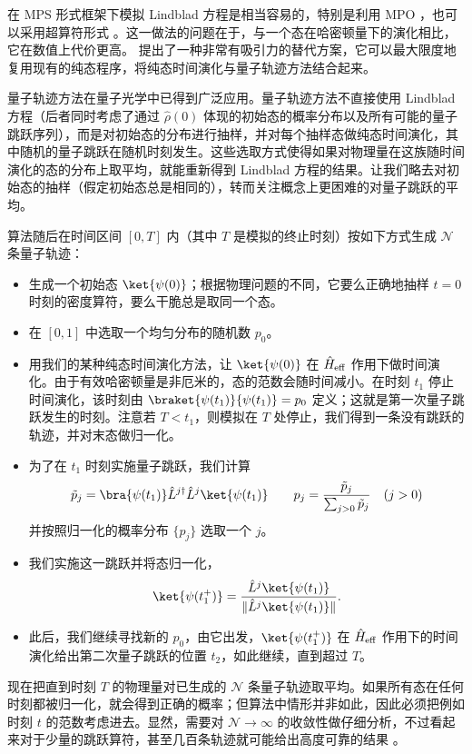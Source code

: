在 MPS 形式框架下模拟 Lindblad 方程是相当容易的，特别是利用 MPO \cite{VerstraeteRipoll04}，也可以采用超算符形式 \cite{VidalZwolak04}。这一做法的问题在于，与一个态在哈密顿量下的演化相比，它在数值上代价更高。\cite{Daley09} 提出了一种非常有吸引力的替代方案，它可以最大限度地复用现有的纯态程序，将纯态时间演化与量子轨迹方法结合起来。

量子轨迹方法在量子光学中已得到广泛应用\cite{Plenio98}。量子轨迹方法不直接使用 Lindblad 方程（后者同时考虑了通过 $\hat{\rho}(0)$ 体现的初始态的概率分布以及所有可能的量子跳跃序列），而是对初始态的分布进行抽样，并对每个抽样态做纯态时间演化，其中随机的量子跳跃在随机时刻发生。这些选取方式使得如果对物理量在这族随时间演化的态的分布上取平均，就能重新得到 Lindblad 方程的结果。让我们略去对初始态的抽样（假定初始态总是相同的），转而关注概念上更困难的对量子跳跃的平均。

算法随后在时间区间 $[0,T]$ 内（其中 $T$ 是模拟的终止时刻）按如下方式生成 ${\mathcal N}$ 条量子轨迹：
\begin{itemize}
\item 生成一个初始态 $\ket{\psi(0)}$；根据物理问题的不同，它要么正确地抽样 $t=0$ 时刻的密度算符，要么干脆总是取同一个态。
\item 在 $[0,1]$ 中选取一个均匀分布的随机数 $p_0$。
\item 用我们的某种纯态时间演化方法，让 $\ket{\psi(0)}$ 在 $\hat{H}_{{\rm eff}}$ 作用下做时间演化。由于有效哈密顿量是非厄米的，态的范数会随时间减小。在时刻 $t_1$ 停止时间演化，该时刻由
$\braket{\psi(t_1)}{\psi(t_1)} = p_0$ 定义；这就是第一次量子跳跃发生的时刻。注意若 $T<t_1$，则模拟在 $T$ 处停止，我们得到一条没有跳跃的轨迹，并对末态做归一化。
\item 为了在 $t_1$ 时刻实施量子跳跃，我们计算
\begin{equation}
\tilde{p}_j = \bra{\psi(t_1)} \hat{L}^{j\dagger} \hat{L}^j \ket{\psi(t_1)} \quad\quad p_j = \frac{\tilde{p}_j}{\sum_{j>0} \tilde{p}_j} \quad (j>0)
\end{equation}
并按照归一化的概率分布 $\{ p_j \}$ 选取一个 $j$。
\item 我们实施这一跳跃并将态归一化，
\begin{equation}
\ket{\psi(t_1^+)} = \frac{\hat{L}^j \ket{\psi(t_1)}}{\| \hat{L}^j \ket{\psi(t_1)} \|} .
\end{equation}
\item 此后，我们继续寻找新的 $p_0$，由它出发，$\ket{\psi(t_1^+)}$ 在 $\hat{H}_{{\rm eff}}$ 作用下的时间演化给出第二次量子跳跃的位置 $t_2$，如此继续，直到超过 $T$。
\end{itemize}
现在把直到时刻 $T$ 的物理量对已生成的 ${\mathcal N}$ 条量子轨迹取平均。如果所有态在任何时刻都被归一化，就会得到正确的概率；但算法中情形并非如此，因此必须把例如时刻 $t$ 的范数考虑进去。显然，需要对 ${\mathcal N} \rightarrow \infty$ 的收敛性做仔细分析，不过看起来对于少量的跳跃算符，甚至几百条轨迹就可能给出高度可靠的结果 \cite{Daley09}。

